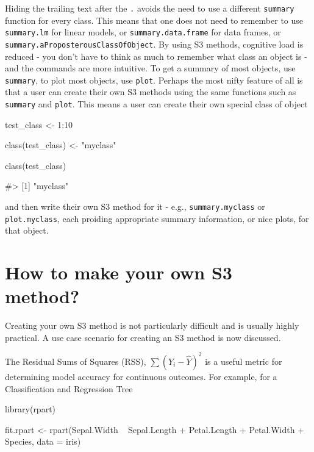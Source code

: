 Hiding the trailing text after the \texttt{.} avoids the need to use a
different \texttt{summary} function for every class. This means that one
does not need to remember to use \texttt{summary.lm} for linear models,
or \texttt{summary.data.frame} for data frames, or
\texttt{summary.aProposterousClassOfObject}. By using S3 methods,
cognitive load is reduced - you don't have to think as much to remember
what class an object is - and the commands are more intuitive. To get a
summary of most objects, use \texttt{summary}, to plot most objects, use
\texttt{plot}. Perhaps the most nifty feature of all is that a user can
create their own S3 methods using the same functions such as
\texttt{summary} and \texttt{plot}. This means a user can create their
own special class of object

\begin{Schunk}
\begin{Sinput}
test_class <- 1:10

class(test_class) <- "myclass"

class(test_class)
\end{Sinput}
\begin{Soutput}
#> [1] "myclass"
\end{Soutput}
\end{Schunk}

and then write their own S3 method for it - e.g.,
\texttt{summary.myclass} or \texttt{plot.myclass}, each proiding
appropriate summary information, or nice plots, for that object.

\section{How to make your own S3
method?}\label{how-to-make-your-own-s3-method}

Creating your own S3 method is not particularly difficult and is usually
highly practical. A use case scenario for creating an S3 method is now
discussed.

The Residual Sums of Squares (RSS), \(\sum(Y_i - \hat{Y})^2\) is a
useful metric for determining model accuracy for continuous outcomes.
For example, for a Classification and Regression Tree

\begin{Schunk}
\begin{Sinput}
library(rpart)

fit.rpart <- rpart(Sepal.Width ~ Sepal.Length + Petal.Length + Petal.Width + Species, data = iris)
\end{Sinput}
\end{Schunk}

